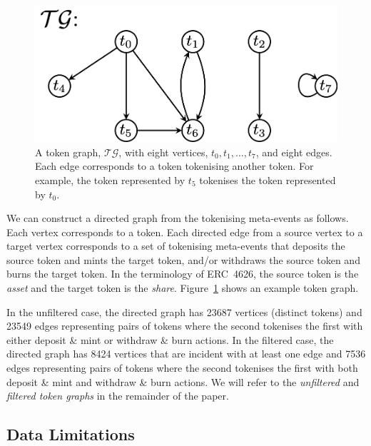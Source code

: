 \begin{figure}
  \centerline{\includegraphics[width=0.8\columnwidth]{img/token-graph/token-graph.png}}
  \caption{A token graph, $\mathcal{TG}$, with eight vertices, $t_0,
    t_1, \ldots, t_7$, and eight edges.  Each edge corresponds to a
    token tokenising another token.  For example, the token
    represented by $t_5$ tokenises the token represented by
    $t_0$.}\label{fig:token-graph}
\end{figure}

We can construct a directed graph from the tokenising meta-events as
follows.  Each vertex corresponds to a token.  Each directed edge from
a source vertex to a target vertex corresponds to a set of tokenising
meta-events that deposits the source token and mints the target token,
and/or withdraws the source token and burns the target token.  In the
terminology of ERC~4626, the source token is the \textit{asset} and
the target token is the \textit{share}.  Figure~\ref{fig:token-graph}
shows an example token graph.

In the unfiltered case, the directed graph has \num{23687} vertices
(distinct tokens) and \num{23549} edges representing pairs of tokens
where the second tokenises the first with either deposit \& mint or
withdraw \& burn actions.  In the filtered case, the directed graph
has \num{8424} vertices that are incident with at least one edge and
\num{7536} edges representing pairs of tokens where the second
tokenises the first with both deposit \& mint and withdraw \& burn
actions.  We will refer to the \textit{unfiltered} and
\textit{filtered token graphs} in the remainder of the paper.

\subsection{Data Limitations}\label{sec:token-comp-limitations}

